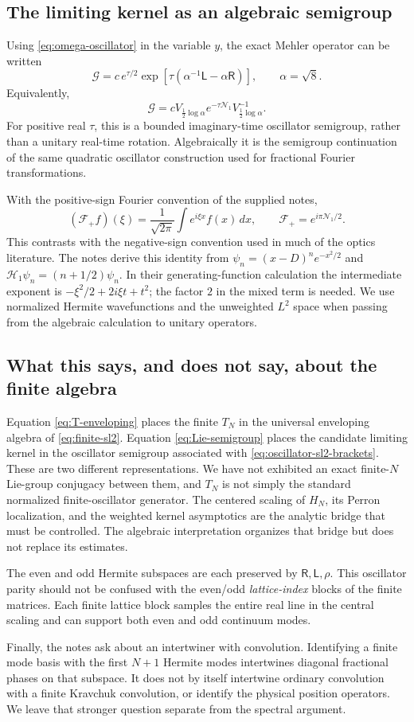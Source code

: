 \subsection{The limiting kernel as an algebraic semigroup}
Using \eqref{eq:omega-oscillator} in the variable $y$, the exact
Mehler operator can be written
\begin{equation}\label{eq:Lie-semigroup}
\boxed{
\mathcal G=c\,e^{\tau/2}
\exp\left[\tau(\alpha^{-1}\mathsf L-\alpha\mathsf R)\right],
\qquad \alpha=\sqrt8.
}
\end{equation}
Equivalently,
\[
\mathcal G=cV_{\frac12\log\alpha}
 e^{-\tau\mathcal N_1}V_{\frac12\log\alpha}^{-1}.
\]
For positive real $\tau$, this is a bounded imaginary-time oscillator
semigroup, rather than a unitary real-time rotation. Algebraically it
is the semigroup continuation of the same quadratic oscillator
construction used for fractional Fourier transformations.

With the positive-sign Fourier convention of the supplied notes,
\[
(\mathcal F_+f)(\xi)=\frac1{\sqrt{2\pi}}\int e^{i\xi x}f(x)\,dx,
\qquad
\mathcal F_+=e^{i\pi\mathcal N_1/2}.
\]
This contrasts with the negative-sign convention used in much of the
optics literature. The notes derive this identity from
$\psi_n=(x-D)^ne^{-x^2/2}$ and
$\mathscr H_1\psi_n=(n+1/2)\psi_n$.
In their generating-function calculation the intermediate exponent
is $-\xi^2/2+2i\xi t+t^2$; the factor $2$ in the mixed term is needed.
We use normalized Hermite wavefunctions and the unweighted $L^2$ space
when passing from the algebraic calculation to unitary operators.

\subsection{What this says, and does not say, about the finite algebra}
Equation \eqref{eq:T-enveloping} places the finite $T_N$ in the universal
enveloping algebra of \eqref{eq:finite-sl2}. Equation
\eqref{eq:Lie-semigroup} places the candidate limiting kernel in the
oscillator semigroup associated with \eqref{eq:oscillator-sl2-brackets}.
These are two different representations. We have not exhibited an
exact finite-$N$ Lie-group conjugacy between them, and $T_N$ is not
simply the standard normalized finite-oscillator generator.
The centered scaling of $H_N$, its Perron localization, and the
weighted kernel asymptotics are the analytic bridge that must be
controlled. The algebraic interpretation organizes that bridge but
does not replace its estimates.

The even and odd Hermite subspaces are each preserved by
$\mathsf R,\mathsf L,\rho$. This oscillator parity should not be
confused with the even/odd \emph{lattice-index} blocks of the finite
matrices. Each finite lattice block samples the entire real line in
the central scaling and can support both even and odd continuum modes.

Finally, the notes ask about an intertwiner with convolution.
Identifying a finite mode basis with the first $N+1$ Hermite modes
intertwines diagonal fractional phases on that subspace. It does not
by itself intertwine ordinary convolution with a finite Kravchuk
convolution, or identify the physical position operators. We leave
that stronger question separate from the spectral argument.

